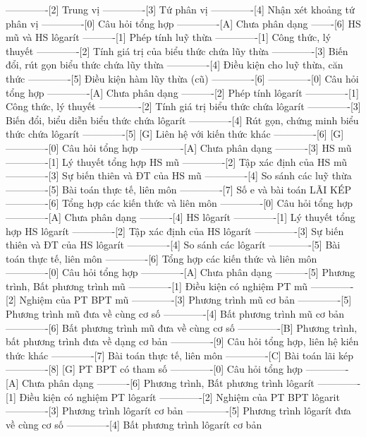 -------------[2] Trung vị
-------------[3] Tứ phân vị
-------------[4] Nhận xét khoảng tứ phân vị
-------------[0] Câu hỏi tổng hợp
-------------[A] Chưa phân dạng
-------[6] HS mũ và HS lôgarít
----------[1] Phép tính luỹ thừa
-------------[1] Công thức, lý thuyết
-------------[2] Tính giá trị của biểu thức chứa lũy thừa
-------------[3] Biến đổi, rút gọn biểu thức chứa lũy thừa
-------------[4] Điều kiện cho luỹ thừa, căn thức
-------------[5] Điều kiện hàm lũy thừa (cũ)
-------------[6] 
-------------[0] Câu hỏi tổng hợp
-------------[A] Chưa phân dạng
----------[2] Phép tính lôgarít
-------------[1] Công thức, lý thuyết
-------------[2] Tính giá trị biểu thức chứa lôgarít
-------------[3] Biến đổi, biểu diễn biểu thức chứa lôgarít
-------------[4] Rút gọn, chứng minh biểu thức chứa lôgarít
-------------[5] [G] Liên hệ với kiến thức khác
-------------[6] [G]
-------------[0] Câu hỏi tổng hợp
-------------[A] Chưa phân dạng
----------[3] HS mũ
-------------[1] Lý thuyết tổng hợp HS mũ
-------------[2] Tập xác định của HS mũ
-------------[3] Sự biến thiên và ĐT của HS mũ
-------------[4] So sánh các luỹ thừa
-------------[5] Bài toán thực tế, liên môn
-------------[7] Số e và bài toán LÃI KÉP
-------------[6] Tổng hợp các kiến thức và liên môn
-------------[0] Câu hỏi tổng hợp
-------------[A] Chưa phân dạng
----------[4] HS lôgarít
-------------[1] Lý thuyết tổng hợp HS lôgarít
-------------[2] Tập xác định của HS lôgarít
-------------[3] Sự biến thiên và ĐT của HS lôgarít
-------------[4] So sánh các lôgarít
-------------[5] Bài toán thực tế, liên môn
-------------[6] Tổng hợp các kiến thức và liên môn
-------------[0] Câu hỏi tổng hợp
-------------[A] Chưa phân dạng
----------[5] Phương trình, Bất phương trình  mũ 
-------------[1] Điều kiện có nghiệm PT mũ
-------------[2] Nghiệm của PT BPT mũ
-------------[3] Phương trình mũ cơ bản
-------------[5] Phương trình mũ đưa về cùng cơ số
-------------[4] Bất phương trình mũ cơ bản
-------------[6] Bất phương trình mũ đưa về cùng cơ số
-------------[B] Phương trình, bất phương trình đưa về dạng cơ bản
-------------[9] Câu hỏi tổng hợp, liên hệ kiến thức khác
-------------[7] Bài toán thực tế, liên môn
-------------[C] Bài toán lãi kép
-------------[8] [G] PT BPT có tham số
-------------[0] Câu hỏi tổng hợp
-------------[A] Chưa phân dạng
----------[6] Phương trình, Bất phương trình lôgarít
-------------[1] Điều kiện có nghiệm PT lôgarít
-------------[2] Nghiệm của PT BPT lôgarit
-------------[3] Phương trình lôgarít cơ bản
-------------[5] Phương trình lôgarít đưa về cùng cơ số
-------------[4] Bất phương trình lôgarít cơ bản
